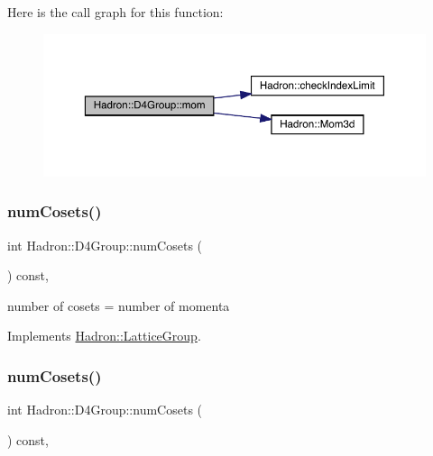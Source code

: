 Here is the call graph for this function\+:
\nopagebreak
\begin{figure}[H]
\begin{center}
\leavevmode
\includegraphics[width=350pt]{de/d5e/structHadron_1_1D4Group_aeb999dc93b1a1a99ed4ffd53977a163b_cgraph}
\end{center}
\end{figure}
\mbox{\label{structHadron_1_1D4Group_a97eed87299880400afc5e9bb1ee222bc}} 
\subsubsection{\texorpdfstring{numCosets()}{numCosets()}\hspace{0.1cm}{\footnotesize\ttfamily [1/3]}}
{\footnotesize\ttfamily int Hadron\+::\+D4\+Group\+::num\+Cosets (\begin{DoxyParamCaption}{ }\end{DoxyParamCaption}) const\hspace{0.3cm}{\ttfamily [inline]}, {\ttfamily [virtual]}}

number of cosets = number of momenta 

Implements \mbox{\hyperlink{structHadron_1_1LatticeGroup_afc76430f36a3a041f86d4058c59bf55e}{Hadron\+::\+Lattice\+Group}}.

\mbox{\label{structHadron_1_1D4Group_a97eed87299880400afc5e9bb1ee222bc}} 
\subsubsection{\texorpdfstring{numCosets()}{numCosets()}\hspace{0.1cm}{\footnotesize\ttfamily [2/3]}}
{\footnotesize\ttfamily int Hadron\+::\+D4\+Group\+::num\+Cosets (\begin{DoxyParamCaption}{ }\end{DoxyParamCaption}) const\hspace{0.3cm}{\ttfamily [inline]}, {\ttfamily [virtual]}}

